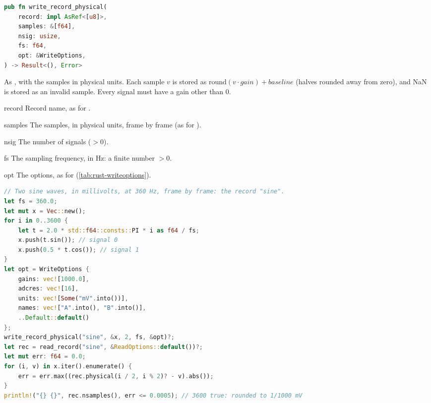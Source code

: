 \begin{lstlisting}[language=Rust,style=signature]
pub fn write_record_physical(
    record: impl AsRef<[u8]>,
    samples: &[f64],
    nsig: usize,
    fs: f64,
    opt: &WriteOptions,
) -> Result<(), Error>
\end{lstlisting}
As , with the samples in physical units. Each sample $v$ is stored as
$\mathrm{round}(v \cdot \mathit{gain}) + \mathit{baseline}$ (halves rounded away from
zero), and NaN is stored as an invalid sample. Every signal must have a gain other than
0.
\begin{params}
\item[record] Record name, as for .
\item[samples] The samples, in physical units, frame by frame (as for
  ).
\item[nsig] The number of signals ($> 0$).
\item[fs] The sampling frequency, in Hz: a finite number $> 0$.
\item[opt] The options, as for  (\cref{tab:rust-writeoptions}).
\end{params}
\begin{lstlisting}[language=Rust,style=example]
// Two sine waves, in millivolts, at 360 Hz, frame by frame: the record "sine".
let fs = 360.0;
let mut x = Vec::new();
for i in 0..3600 {
    let t = 2.0 * std::f64::consts::PI * i as f64 / fs;
    x.push(t.sin()); // signal 0
    x.push(0.5 * t.cos()); // signal 1
}
let opt = WriteOptions {
    gains: vec![1000.0],
    adcres: vec![16],
    units: vec![Some("mV".into())],
    names: vec!["A".into(), "B".into()],
    ..Default::default()
};
write_record_physical("sine", &x, 2, fs, &opt)?;
let rec = read_record("sine", &ReadOptions::default())?;
let mut err: f64 = 0.0;
for (i, v) in x.iter().enumerate() {
    err = err.max((rec.physical(i / 2, i % 2)? - v).abs());
}
println!("{} {}", rec.nsamples(), err <= 0.0005); // 3600 true: rounded to 1/1000 mV
\end{lstlisting}

